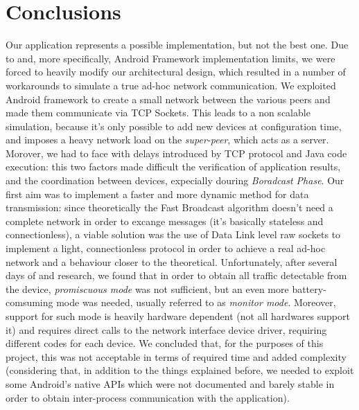 \section{Conclusions}
	Our application represents a possible implementation, but not the best one. Due to \direct and, more specifically, Android \direct Framework implementation limits, we were forced to heavily modify our architectural design, which resulted in a number of workarounds to simulate a true ad-hoc network communication. We exploited Android \direct framework to create a small network between the various peers and made them communicate via TCP Sockets. This leads to a non scalable simulation, because it's only possible to add new devices at configuration time, and imposes a heavy network load on the \textit{super-peer}, which acts as a server.
	Morover, we had to face with delays introduced by TCP protocol and Java code execution: this two factors made difficult the verification of application results, and the coordination between devices, expecially douring \textit{Boradcast Phase}.
	Our first aim was to implement a faster and more dynamic method for data transmission: since theoretically the Fast Broadcast algorithm doesn't need a complete network in order to excange messages (it's basically stateless and connectionless), a viable solution was the use of Data Link level raw sockets to implement a light, connectionless protocol in order to achieve a real ad-hoc network and a behaviour closer to the theoretical. Unfortunately, after several days of and research, we found that in order to obtain all traffic detectable from the device, \textit{promiscuous mode} was not sufficient, but an even more battery-comsuming mode was needed, usually referred to as \textit{monitor mode}. Moreover, support for such mode is heavily hardware dependent (not all hardwares support it) and requires direct calls to the network interface device driver, requiring different codes for each device. We concluded that, for the purposes of this project, this was not acceptable in terms of required time and added complexity (considering that, in addition to the things explained before, we needed to exploit some Android's native APIs which were not documented and barely stable in order to obtain inter-process communication with the application).
